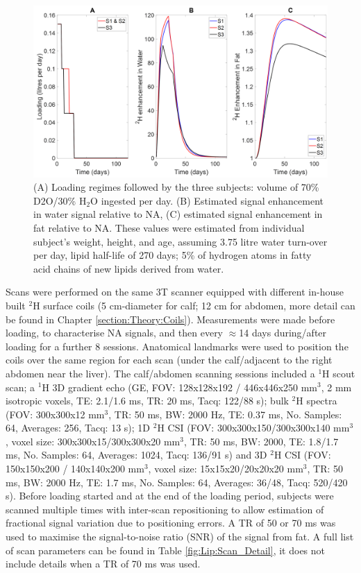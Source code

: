 \documentclass[class=article, crop=false]{standalone}
\begin{document}
\begin{figure}
    \centering
    \includegraphics[width=1\textwidth]{Figures/Lipid/Loading_Routine.png}
    \caption{(A) Loading regimes followed by the three subjects: volume of 70\% D2O/30\% H$_2$O ingested per day. (B) Estimated signal enhancement in water signal relative to NA, (C) estimated signal enhancement in fat relative to NA. These values were estimated from individual subject’s weight, height, and age, assuming 3.75 litre water turn-over per day, lipid half-life of 270 days\cite{Carnethon2002Serum19871998}; 5\% of hydrogen atoms in fatty acid chains of new lipids derived from water\cite{Turner2003MeasurementMIDA}.}
    \label{fig:Lip:Load}
\end{figure}

Scans were performed on the same 3T scanner equipped with different in-house built $^2$H surface coils (5 cm-diameter for calf; 12 cm for abdomen, more detail can be found in Chapter \ref{section:Theory:Coils}). Measurements were made before loading, to characterise NA signals, and then every $\approx$14 days during/after loading for a further 8 sessions. Anatomical landmarks were used to position the coils over the same region for each scan (under the calf/adjacent to the right abdomen near the liver). The calf/abdomen scanning sessions included a $^1$H scout scan; a $^1$H 3D gradient echo (GE, FOV: 128x128x192 / 446x446x250 mm$^3$, 2 mm isotropic voxels, TE: 2.1/1.6 ms, TR: 20 ms, Tacq: 122/88 s); bulk $^2$H spectra (FOV: 300x300x12 mm$^3$, TR: 50 ms, BW: 2000 Hz, TE: 0.37 ms, No. Samples: 64, Averages: 256, Tacq: 13 s); 1D $^2$H CSI (FOV: 300x300x150/300x300x140 mm$^3$, voxel size: 300x300x15/300x300x20 mm$^3$, TR: 50 ms, BW: 2000, TE: 1.8/1.7 ms, No. Samples: 64, Averages: 1024, Tacq: 136/91 s) and 3D $^2$H CSI (FOV: 150x150x200 / 140x140x200 mm$^3$, voxel size: 15x15x20/20x20x20 mm$^3$, TR: 50 ms, BW: 2000 Hz, TE: 1.7 ms, No. Samples: 64, Averages: 36/48, Tacq: 520/420 s). Before loading started and at the end of the loading period, subjects were scanned multiple times with inter-scan repositioning to allow estimation of fractional signal variation due to positioning errors. A TR of 50 or 70 ms was used to maximise the signal-to-noise ratio (SNR) of the signal from fat. A full list of scan parameters can be found in Table \ref{fig:Lip:Scan_Detail}, it does not include details when a TR of 70 ms was used.
\end{document}
